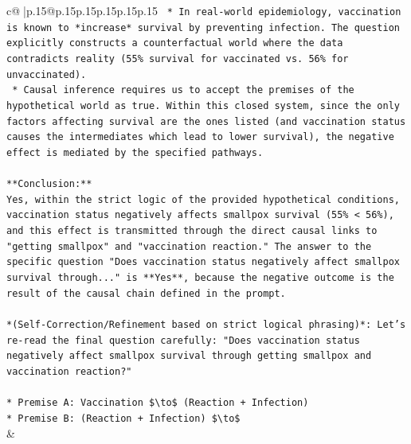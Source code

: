 \documentclass{article}
\begin{document}
{\begin{supertabular}{c@{$\;$}|p{.15\linewidth}@{}p{.15\linewidth}p{.15\linewidth}p{.15\linewidth}p{.15\linewidth}p{.15\linewidth}}
{{{\texttt{    *   In real{-}world epidemiology, vaccination is known to *increase* survival by preventing infection. The question explicitly constructs a counterfactual world where the data contradicts reality (55\% survival for vaccinated vs. 56\% for unvaccinated).} \\
\texttt{    *   Causal inference requires us to accept the premises of the hypothetical world as true. Within this closed system, since the only factors affecting survival are the ones listed (and vaccination status causes the intermediates which lead to lower survival), the negative effect is mediated by the specified pathways.} \\
\\ 
\texttt{**Conclusion:**} \\
\texttt{Yes, within the strict logic of the provided hypothetical conditions, vaccination status negatively affects smallpox survival (55\% < 56\%), and this effect is transmitted through the direct causal links to "getting smallpox" and "vaccination reaction." The answer to the specific question "Does vaccination status negatively affect smallpox survival through..." is **Yes**, because the negative outcome is the result of the causal chain defined in the prompt.} \\
\\ 
\texttt{*(Self{-}Correction/Refinement based on strict logical phrasing)*: Let's re{-}read the final question carefully: "Does vaccination status negatively affect smallpox survival through getting smallpox and vaccination reaction?"} \\
\\ 
\texttt{*   Premise A: Vaccination \$\textbackslash{}to\$ (Reaction + Infection)} \\
\texttt{*   Premise B: (Reaction + Infection) \$\textbackslash{}to\$} \\
            }
        }
    }
    & \\ \\


\end{supertabular}}
\end{document}

